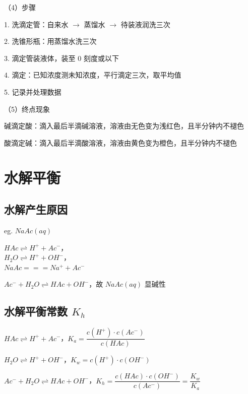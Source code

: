 \documentclass[UTF8,zihao=-4,openany]{ctexbook}
\begin{document}
（4）步骤\par

1. 洗滴定管：自来水 $\to$ 蒸馏水 $\to$ 待装液润洗三次\par

2. 洗锥形瓶：用蒸馏水洗三次\par

3. 滴定管装液体，装至 $0$ 刻度或以下\par

4. 滴定：已知浓度测未知浓度，平行滴定三次，取平均值\par

5. 记录并处理数据\par

（5）终点现象\par

碱滴定酸：滴入最后半滴碱溶液，溶液由无色变为浅红色，且半分钟内不褪色\par

酸滴定碱：滴入最后半滴酸溶液，溶液由黄色变为橙色，且半分钟内不褪色\par
\section{水解平衡}
\subsection{水解产生原因}
eg. $NaAc(aq)$\par

$HAc\rightleftharpoons H^++Ac^-$，\\[0.25em]
\hspace*{2em}$H_2O\rightleftharpoons H^++OH^-$，\\[0.25em]
\hspace*{2em}$NaAc=\!=\!=Na^++Ac^-$\par

$Ac^-+H_2O\rightleftharpoons HAc+OH^-$，故 $NaAc(aq)$ 显碱性\par
\subsection{水解平衡常数 $K_h$}
$HAc\rightleftharpoons H^++Ac^-$，$K_a=\dfrac{c(H^+)\cdot c(Ac^-)}{c(HAc)}$\par

$H_2O\rightleftharpoons H^++OH^-$，$K_w=c(H^+)\cdot c(OH^-)$\par

$Ac^-+H_2O\rightleftharpoons HAc+OH^-$，$K_h=\dfrac{c(HAc)\cdot c(OH^-)}{c(Ac^-)}=\dfrac{K_w}{K_a}$\par
\end{document}
